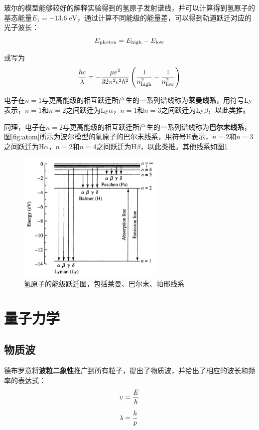 玻尔的模型能够较好的解释实验得到的氢原子发射谱线，并可以计算得到氢原子的基态能量$E_1=-13.6\;\mathrm{eV}$，通过计算不同能级的能量差，可以得到轨道跃迁对应的光子波长：
\begin{equation}
  E_\mathrm{photon}=E_\mathrm{high}-E_\mathrm{low}\notag
\end{equation}

或写为
\begin{equation}
  {hc \over \lambda}=-{\mu e^4\over 32\pi^2\epsilon^2\hbar^2} \left({1\over n_\mathrm{high}^2}- {1\over n_\mathrm{low}^2}\right)
\end{equation}

电子在$n=1$与更高能级的相互跃迁所产生的一系列谱线称为\textbf{莱曼线系}，用符号Ly表示，$n=1$和$n=2$之间跃迁为Ly$\alpha$，$n=1$和$n=3$之间跃迁为Ly$\beta$，以此类推。

同理，电子在$n=2$与更高能级的相互跃迁所产生的一系列谱线称为\textbf{巴尔末线系}，图\ref{fig:atom}所示为波尔模型的氢原子的巴尔末线系，用符号H表示，$n=2$和$n=3$之间跃迁为H$\alpha$，$n=2$和$n=4$之间跃迁为H$\beta$，以此类推。其他线系如图\ref{fig:level}

\begin{figure}[hbt]
  \centering
  \includegraphics[width=7cm]{chapters/05/level}
  \caption{氢原子的能级跃迁图，包括莱曼、巴尔末、帕邢线系}
  \label{fig:level}
\end{figure}

\section{量子力学}
\subsection{物质波}
德布罗意将\textbf{波粒二象性}推广到所有粒子，提出了物质波，并给出了相应的波长和频率的表达式：
\begin{align}
  \upsilon &= {E\over h}\\[2mm]
  \lambda &= {h\over p}
\end{align}

